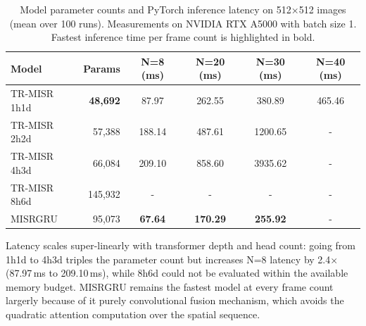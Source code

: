 \begin{table}[htbp]
  \centering
  \begin{tabular}{lrcccc}
    \hline
    \textbf{Model} & \textbf{Params} & \textbf{N=8 (ms)} & \textbf{N=20 (ms)} & \textbf{N=30 (ms)}  & \textbf{N=40 (ms)}\\
    \hline
    TR-MISR 1h1d  &  \textbf{48,692} & 87.97 & 262.55 & 380.89 & 465.46\\
    TR-MISR 2h2d  &  57,388 & 188.14 & 487.61 & 1200.65 & - \\
    TR-MISR 4h3d  &  66,084 & 209.10 & 858.60 & 3935.62 & -\\
    TR-MISR 8h6d  & 145,932 & - & - & - & - \\
    MISRGRU       &  95,073 & \textbf{67.64} & \textbf{170.29} & \textbf{255.92} & -\\
    \hline
  \end{tabular}
  \caption{Model parameter counts and PyTorch inference latency on 512×512 images 
  (mean over 100 runs). Measurements on NVIDIA RTX A5000 with batch size 1. 
  Fastest inference time per frame count is highlighted in bold.}
  \label{tab:inference_latency}
\end{table}


Latency scales super-linearly with transformer depth and head count: going from 1h1d          
to 4h3d triples the parameter count but increases N=8 latency by 2.4× (87.97\,ms to           
209.10\,ms), while 8h6d could not be evaluated within the available memory budget.            
MISRGRU remains the fastest model at every frame count largerly because of it purely convolutional      
fusion mechanism, which avoids the quadratic attention computation over the spatial sequence.      
                                                                                              
